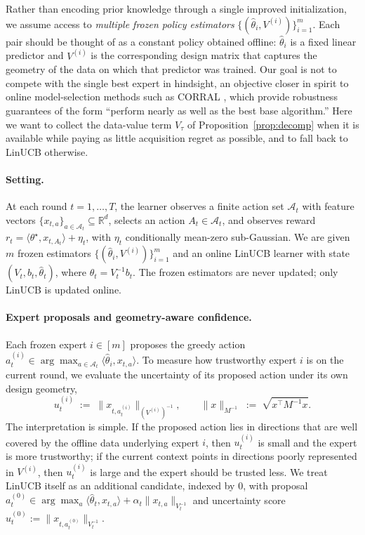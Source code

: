 \documentclass{article}
\theoremstyle{definition}
\theoremstyle{remark}
\theoremstyle{remark}
\begin{document}
Rather than encoding prior knowledge through a single improved
initialization, we assume access to \emph{multiple frozen policy
estimators} $\{(\widehat\theta_i,V^{(i)})\}_{i=1}^m$. Each pair should
be thought of as a constant policy obtained offline:
$\widehat\theta_i$ is a fixed linear predictor and $V^{(i)}$ is the
corresponding design matrix that captures the geometry of the data on
which that predictor was trained. Our goal is not to compete with the
single best expert in hindsight, an objective closer in spirit to
online model-selection methods such as CORRAL
\cite{agarwal2017corralling,chen2024llmdecision}, which provide
robustness guarantees of the form ``perform nearly as well as the best
base algorithm.'' Here we want to collect the data-value term $V_\tau$ of
Proposition~\ref{prop:decomp} when it is available while paying as little
acquisition regret as possible, and to fall back to LinUCB otherwise.

\paragraph{Setting.}
At each round $t=1,\dots,T$, the learner observes a finite action set
$\mathcal A_t$ with feature vectors
$\{x_{t,a}\}_{a\in\mathcal A_t}\subseteq\mathbb R^d$, selects an action
$A_t\in\mathcal A_t$, and observes reward
$r_t = \langle\theta^\star,x_{t,A_t}\rangle + \eta_t$,
with $\eta_t$ conditionally mean-zero sub-Gaussian.
We are given $m$ frozen estimators
$\{(\widehat\theta_i,V^{(i)})\}_{i=1}^m$ and an online LinUCB learner
with state $(V_t,b_t,\widehat\theta_t)$, where
$\widehat\theta_t = V_t^{-1}b_t$. The frozen estimators are never
updated; only LinUCB is updated online.

\paragraph{Expert proposals and geometry-aware confidence.}
Each frozen expert $i\in[m]$ proposes the greedy action
$a_t^{(i)}\in\arg\max_{a\in\mathcal A_t}\langle\widehat\theta_i,x_{t,a}\rangle$.
To measure how trustworthy expert $i$ is on the current round, we
evaluate the uncertainty of its proposed action under its own design
geometry,
\[
u_t^{(i)} \;:=\; \bigl\|x_{t,a_t^{(i)}}\bigr\|_{(V^{(i)})^{-1}},
\qquad
\|x\|_{M^{-1}} \;:=\; \sqrt{x^\top M^{-1}x}.
\]
The interpretation is simple. If the proposed action lies in directions
that are well covered by the offline data underlying expert $i$, then
$u_t^{(i)}$ is small and the expert is more trustworthy; if the current
context points in directions poorly represented in $V^{(i)}$, then
$u_t^{(i)}$ is large and the expert should be trusted less. We treat
LinUCB itself as an additional candidate, indexed by $0$, with proposal
$a_t^{(0)}\in\arg\max_a\langle\widehat\theta_t,x_{t,a}\rangle+\alpha_t\|x_{t,a}\|_{V_t^{-1}}$
and uncertainty score $u_t^{(0)} := \|x_{t,a_t^{(0)}}\|_{V_t^{-1}}$.
\end{document}
